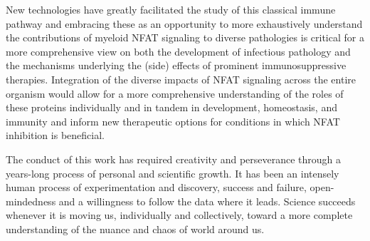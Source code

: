 New technologies have greatly facilitated the study of this classical immune pathway and embracing these as an opportunity to more exhaustively understand the contributions of myeloid NFAT signaling to diverse pathologies is critical for a more comprehensive view on both the development of infectious pathology and the mechanisms underlying the (side) effects of prominent immunosuppressive therapies. Integration of the diverse impacts of NFAT signaling across the entire organism would allow for a more comprehensive understanding of the roles of these proteins individually and in tandem in development, homeostasis, and immunity and inform new therapeutic options for conditions in which NFAT inhibition is beneficial. 

The conduct of this work has required creativity and perseverance through a years\hyp{}long process of personal and scientific growth. It has been an intensely human process of experimentation and discovery, success and failure, open\hyp{}mindedness and a willingness to follow the data where it leads. Science succeeds whenever it is moving us, individually and collectively, toward a more complete understanding of the nuance and chaos of world around us. 
